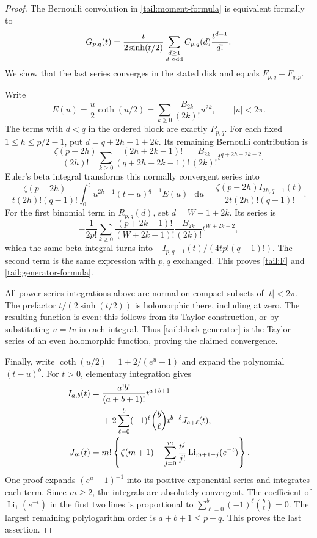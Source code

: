 \documentclass[11pt,a4paper]{article}
\numberwithin{equation}{section}
\theoremstyle{definition}
\theoremstyle{remark}
\newcommand{\dd}{\mathop{}\!\mathrm{d}}
\begin{document}
\begin{proof}
The Bernoulli convolution in \eqref{tail:moment-formula} is
equivalent formally to
\begin{equation}\label{tail:block-generator}
 G_{p,q}(t)=\frac{t}{2\sinh(t/2)}
           \sum_{\substack{d\ge1\\d\ {\rm odd}}}
                        C_{p,q}(d)\frac{t^{d-1}}{d!}.
\end{equation}
We show that the last series converges in the stated disk and
equals \(F_{p,q}+F_{q,p}\).

Write
\[
 E(u)=\frac u2\coth(u/2)
     =\sum_{k\ge0}\frac{B_{2k}}{(2k)!}u^{2k},
 \qquad |u|<2\pi.
\]
The terms with \(d<q\) in the ordered block are exactly
\(P_{p,q}\). For each fixed \(1\le h\le p/2-1\), put
\(d=q+2h-1+2k\). Its remaining Bernoulli contribution is
\[
 \frac{\zeta(p-2h)}{(2h)!}
 \sum_{k\ge0}\frac{(2h+2k-1)!}{(q+2h+2k-1)!}
            \frac{B_{2k}}{(2k)!}t^{q+2h+2k-2}.
\]
Euler's beta integral transforms this normally convergent series
into
\[
 \frac{\zeta(p-2h)}{t(2h)!(q-1)!}
       \int_0^t u^{2h-1}(t-u)^{q-1}E(u)\,\dd u
   =\frac{\zeta(p-2h)I_{2h,q-1}(t)}
          {2t(2h)!(q-1)!}.
\]
For the first binomial term in \(R_{p,q}(d)\), set
\(d=W-1+2k\). Its series is
\[
 -\frac1{2p!}\sum_{k\ge0}
    \frac{(p+2k-1)!}{(W+2k-1)!}
         \frac{B_{2k}}{(2k)!}t^{W+2k-2},
\]
which the same beta integral turns into
\(-I_{p,q-1}(t)/(4t p!(q-1)!)\). The second term is the
same expression with \(p,q\) exchanged. This proves
\eqref{tail:F} and \eqref{tail:generator-formula}.

All power-series integrations above are normal on compact subsets
of \(|t|<2\pi\). The prefactor \(t/(2\sinh(t/2))\) is
holomorphic there, including at zero. The resulting function is
even: this follows from its Taylor construction, or by substituting
\(u=tv\) in each integral. Thus
\eqref{tail:block-generator} is the Taylor series of an even
holomorphic function, proving the claimed convergence.

Finally, write \(\coth(u/2)=1+2/(e^u-1)\) and expand the
polynomial \((t-u)^b\). For \(t>0\), elementary integration
gives
\begin{align}\label{tail:finite-Li}
 I_{a,b}(t)={}&\frac{a!b!}{(a+b+1)!}t^{a+b+1}\notag\\
 &+2\sum_{\ell=0}^{b}(-1)^\ell\binom b\ell
                     t^{b-\ell}J_{a+\ell}(t),\notag\\
 J_m(t)={}&m!\left\{\zeta(m+1)
       -\sum_{j=0}^{m}\frac{t^j}{j!}
                  \operatorname{Li}_{m+1-j}(e^{-t})\right\}.
\end{align}
One proof expands \((e^u-1)^{-1}\) into its positive exponential
series and integrates each term. Since \(m\ge2\), the
integrals are absolutely convergent. The coefficient of
\(\operatorname{Li}_1(e^{-t})\) in the first two lines is
proportional to \(\sum_{\ell=0}^{b}(-1)^\ell\binom b\ell=0\).
The largest remaining polylogarithm order is
\(a+b+1\le p+q\). This proves the last assertion.
\end{proof}
\end{document}

